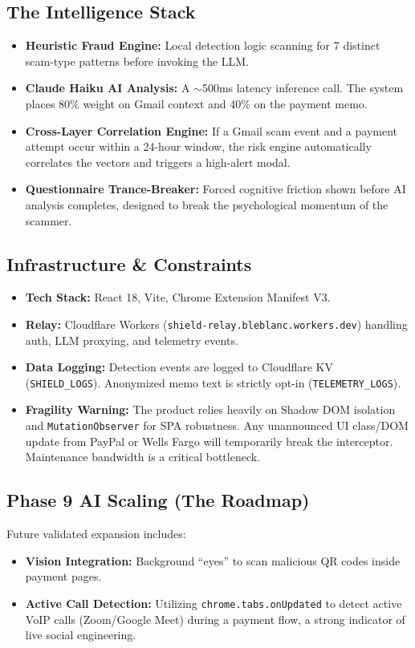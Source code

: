 \documentclass[12pt, letterpaper]{article}
\begin{document}
\subsection{The Intelligence Stack}
\begin{itemize}
    \item \textbf{Heuristic Fraud Engine:} Local detection logic scanning for 7 distinct scam-type patterns before invoking the LLM.
    \item \textbf{Claude Haiku AI Analysis:} A $\sim$500ms latency inference call. The system places 80\% weight on Gmail context and 40\% on the payment memo.
    \item \textbf{Cross-Layer Correlation Engine:} If a Gmail scam event and a payment attempt occur within a 24-hour window, the risk engine automatically correlates the vectors and triggers a high-alert modal.
    \item \textbf{Questionnaire Trance-Breaker:} Forced cognitive friction shown before AI analysis completes, designed to break the psychological momentum of the scammer.
\end{itemize}

\subsection{Infrastructure \& Constraints}
\begin{itemize}
    \item \textbf{Tech Stack:} React 18, Vite, Chrome Extension Manifest V3.
    \item \textbf{Relay:} Cloudflare Workers (\texttt{shield-relay.bleblanc.workers.dev}) handling auth, LLM proxying, and telemetry events.
    \item \textbf{Data Logging:} Detection events are logged to Cloudflare KV (\texttt{SHIELD\_LOGS}). Anonymized memo text is strictly opt-in (\texttt{TELEMETRY\_LOGS}).
    \item \textbf{Fragility Warning:} The product relies heavily on Shadow DOM isolation and \texttt{MutationObserver} for SPA robustness. Any unannounced UI class/DOM update from PayPal or Wells Fargo will temporarily break the interceptor. Maintenance bandwidth is a critical bottleneck.
\end{itemize}

\subsection{Phase 9 AI Scaling (The Roadmap)}
Future validated expansion includes:
\begin{itemize}
    \item \textbf{Vision Integration:} Background ``eyes'' to scan malicious QR codes inside payment pages.
    \item \textbf{Active Call Detection:} Utilizing \texttt{chrome.tabs.onUpdated} to detect active VoIP calls (Zoom/Google Meet) during a payment flow, a strong indicator of live social engineering.
\end{itemize}
\end{document}
